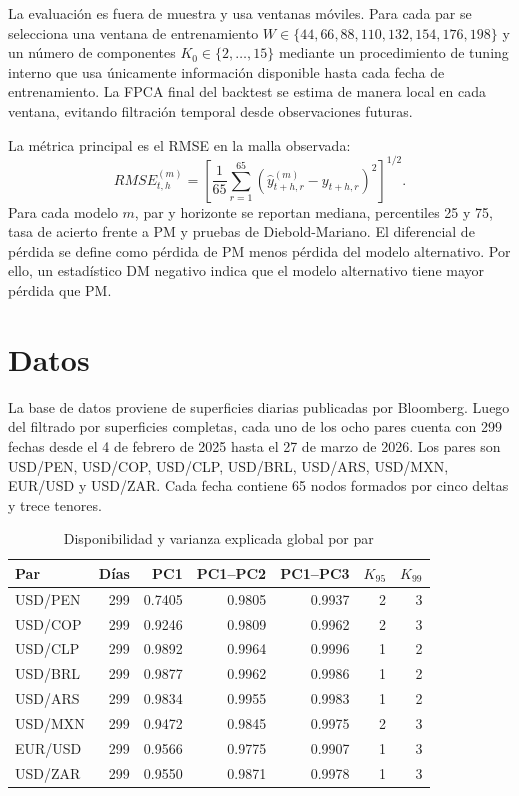 \documentclass[12pt,a4paper]{article}
\begin{document}
La evaluación es fuera de muestra y usa ventanas móviles. Para cada par se selecciona una ventana de entrenamiento \(W\in\{44,66,88,110,132,154,176,198\}\) y un número de componentes \(K_0\in\{2,\ldots,15\}\) mediante un procedimiento de tuning interno que usa únicamente información disponible hasta cada fecha de entrenamiento. La FPCA final del backtest se estima de manera local en cada ventana, evitando filtración temporal desde observaciones futuras.

La métrica principal es el RMSE en la malla observada:
\[
  RMSE_{t,h}^{(m)}=
  \left[
  \frac{1}{65}\sum_{r=1}^{65}
  \left(\widehat y_{t+h,r}^{(m)}-y_{t+h,r}\right)^2
  \right]^{1/2}.
\]
Para cada modelo \(m\), par y horizonte se reportan mediana, percentiles 25 y 75, tasa de acierto frente a PM y pruebas de Diebold-Mariano. El diferencial de pérdida se define como pérdida de PM menos pérdida del modelo alternativo. Por ello, un estadístico DM negativo indica que el modelo alternativo tiene mayor pérdida que PM.

\section{Datos}

La base de datos proviene de superficies diarias publicadas por Bloomberg. Luego del filtrado por superficies completas, cada uno de los ocho pares cuenta con 299 fechas desde el 4 de febrero de 2025 hasta el 27 de marzo de 2026. Los pares son USD/PEN, USD/COP, USD/CLP, USD/BRL, USD/ARS, USD/MXN, EUR/USD y USD/ZAR. Cada fecha contiene 65 nodos formados por cinco deltas y trece tenores.

\begin{table}[H]
\centering
\caption{Disponibilidad y varianza explicada global por par}
\label{tab:fpca_global}
\small
\begin{tabular}{lrrrrrr}
\toprule
Par & Días & PC1 & PC1--PC2 & PC1--PC3 & \(K_{95}\) & \(K_{99}\) \\
\midrule
USD/PEN & 299 & 0.7405 & 0.9805 & 0.9937 & 2 & 3 \\
USD/COP & 299 & 0.9246 & 0.9809 & 0.9962 & 2 & 3 \\
USD/CLP & 299 & 0.9892 & 0.9964 & 0.9996 & 1 & 2 \\
USD/BRL & 299 & 0.9877 & 0.9962 & 0.9986 & 1 & 2 \\
USD/ARS & 299 & 0.9834 & 0.9955 & 0.9983 & 1 & 2 \\
USD/MXN & 299 & 0.9472 & 0.9845 & 0.9975 & 2 & 3 \\
EUR/USD & 299 & 0.9566 & 0.9775 & 0.9907 & 1 & 3 \\
USD/ZAR & 299 & 0.9550 & 0.9871 & 0.9978 & 1 & 3 \\
\bottomrule
\end{tabular}
\end{table}
\end{document}
